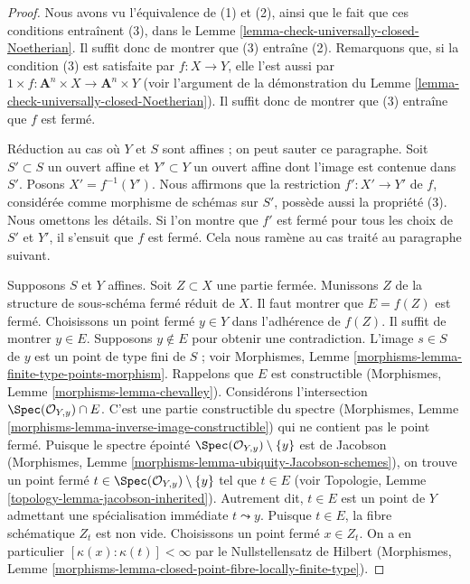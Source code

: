 \begin{proof}
Nous avons vu l'équivalence de (1) et (2), ainsi que le
fait que ces conditions entraînent (3), dans le
Lemme \ref{lemma-check-universally-closed-Noetherian}.
Il suffit donc de montrer que (3) entraîne (2).
Remarquons que, si la condition (3) est satisfaite par $f : X \to Y$,
elle l'est aussi par
$1 \times f : \mathbf{A}^n \times X \to \mathbf{A}^n \times Y$
(voir l'argument de la démonstration du
Lemme \ref{lemma-check-universally-closed-Noetherian}).
Il suffit donc de montrer que (3) entraîne que $f$ est fermé.

\medskip\noindent
Réduction au cas où $Y$ et $S$ sont affines ; on peut
sauter ce paragraphe.
Soit $S' \subset S$ un ouvert affine et $Y' \subset Y$ un
ouvert affine dont l'image est contenue dans $S'$. Posons $X' = f^{-1}(Y')$. Nous
affirmons que la restriction $f' : X' \to Y'$ de $f$, considérée comme morphisme
de schémas sur $S'$, possède aussi la propriété (3). Nous omettons les détails.
Si l'on montre que $f'$ est fermé pour tous les choix de
$S'$ et $Y'$, il s'ensuit que $f$ est fermé. Cela nous ramène
au cas traité au paragraphe suivant.

\medskip\noindent
Supposons $S$ et $Y$ affines. Soit $Z \subset X$ une partie fermée.
Munissons $Z$ de la structure de sous-schéma fermé réduit de $X$.
Il faut montrer que $E = f(Z)$ est fermé. Choisissons un point fermé $y \in Y$
dans l'adhérence de $f(Z)$. Il suffit de montrer $y \in E$.
Supposons $y \not \in E$ pour obtenir une contradiction.
L'image $s \in S$ de $y$ est un point de type fini de $S$ ; voir
Morphismes, Lemme \ref{morphisms-lemma-finite-type-points-morphism}.
Rappelons que $E$ est constructible
(Morphismes, Lemme \ref{morphisms-lemma-chevalley}).
Considérons l'intersection $\Spec(\mathcal{O}_{Y, y}) \cap E$.
C'est une partie constructible du spectre
(Morphismes, Lemme \ref{morphisms-lemma-inverse-image-constructible})
qui ne contient pas le point fermé.
Puisque le spectre épointé
$\Spec(\mathcal{O}_{Y, y}) \setminus \{y\}$ est de Jacobson
(Morphismes, Lemme \ref{morphisms-lemma-ubiquity-Jacobson-schemes}), on trouve un
point fermé $t \in \Spec(\mathcal{O}_{Y, y}) \setminus \{y\}$
tel que $t \in E$ (voir Topologie, Lemme \ref{topology-lemma-jacobson-inherited}).
Autrement dit, $t \in E$ est un point de $Y$
admettant une spécialisation immédiate $t \leadsto y$.
Puisque $t \in E$, la fibre schématique $Z_t$ est non vide.
Choisissons un point fermé $x \in Z_t$. On a en particulier
$[\kappa(x) : \kappa(t)] < \infty$ par le Nullstellensatz de Hilbert
(Morphismes, Lemme
\ref{morphisms-lemma-closed-point-fibre-locally-finite-type}).


\end{proof}
